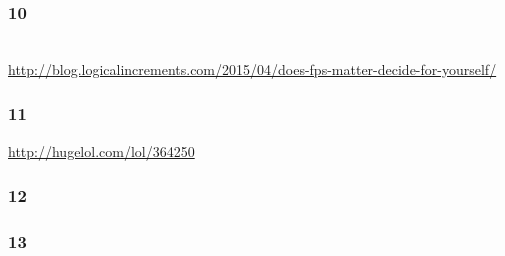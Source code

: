 \documentclass{UDEbeamerEN}
\begin{document}
\begin{frame}
	\frametitle{10}

			\begin{center}
				\\
				\url{http://blog.logicalincrements.com/2015/04/does-fps-matter-decide-for-yourself/}
			\end{center}



\end{frame}

\begin{frame}
	\frametitle{11}

	\begin{center}
		\vspace{2mm}
		\url{http://hugelol.com/lol/364250}
	\end{center}
\end{frame}

\begin{frame}
	\frametitle{12}


\end{frame}

\begin{frame}
	\frametitle{13}


\end{frame}
\end{document}
